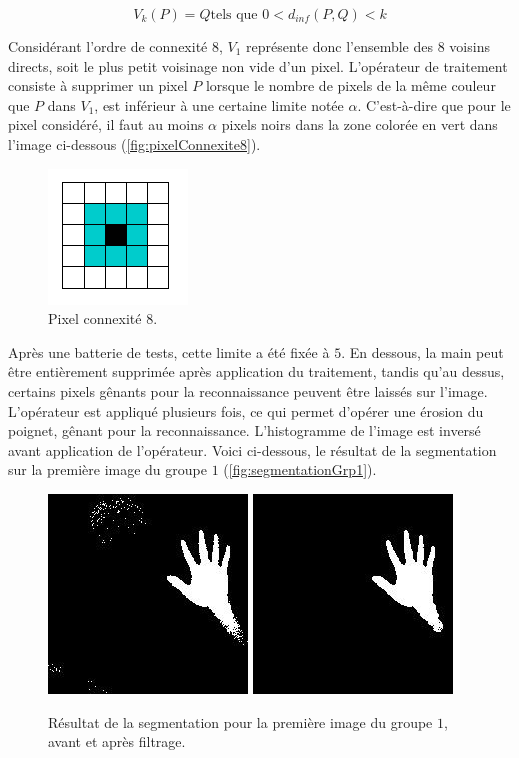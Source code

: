 \[
V_k(P) = Q \text{tels que $0 < d_{inf}(P,Q) < k$}
\]

Considérant l’ordre de connexité $8$, $V_1$ représente donc l’ensemble des $8$ voisins directs, soit le plus petit voisinage non vide d’un pixel. L’opérateur de traitement consiste à supprimer un pixel $P$ lorsque le nombre de pixels de la même couleur que $P$ dans $V_1$, est inférieur à une certaine limite notée $\alpha$.  C'est-à-dire que pour le pixel considéré, il faut au moins $\alpha$ pixels noirs dans la zone colorée en vert dans l’image ci-dessous (\autoref{fig:pixelConnexite8}).

\begin{figure}[htb!]
\centerline{\includegraphics{connexite8.png}}
\caption{Pixel connexité 8.}
\label{fig:pixelConnexite8}
\end{figure}

Après une batterie de tests, cette limite a été fixée à $5$. En dessous, la main peut être entièrement supprimée après application du traitement, tandis qu’au dessus, certains pixels gênants pour la reconnaissance peuvent être laissés sur l’image. L’opérateur est appliqué plusieurs fois, ce qui permet d'opérer une érosion du poignet, gênant pour la reconnaissance. L’histogramme de l’image est inversé avant application de l’opérateur. Voici ci-dessous, le résultat de la segmentation sur la première image du groupe $1$ (\autoref{fig:segmentationGrp1}).

\begin{figure}
\centerline{
\includegraphics[scale=0.6]{segIn.jpg}
\includegraphics[scale=0.6]{segOut.jpg}
}
\caption{Résultat de la segmentation pour la première image du groupe $1$, avant et après filtrage.}
\label{fig:segmentationGrp1}
\end{figure}

